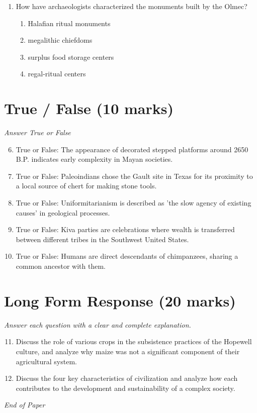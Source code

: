 \documentclass[12pt]{article}
\begin{document}
\begin{enumerate}[label=\arabic*.]
\begin{enumerate}[label=(\alph*)]
    \item greater regional differentiation
    \item active trading between the North and South
\end{enumerate}
\item How have archaeologists characterized the monuments built by the Olmec?
\begin{enumerate}[label=(\alph*)]
    \item Halafian ritual monuments
    \item megalithic chiefdoms
    \item surplus food storage centers
    \item regal-ritual centers
\end{enumerate}
\end{enumerate}

\section*{True / False (10 marks)}
\textit{Answer True or False}
\begin{enumerate}[label=\arabic*.]
\setcounter{enumi}{5}
\item True or False: The appearance of decorated stepped platforms around 2650 B.P. indicates early complexity in Mayan societies.
\item True or False: Paleoindians chose the Gault site in Texas for its proximity to a local source of chert for making stone tools.
\item True or False: Uniformitarianism is described as 'the slow agency of existing causes' in geological processes.
\item True or False: Kiva parties are celebrations where wealth is transferred between different tribes in the Southwest United States.
\item True or False: Humans are direct descendants of chimpanzees, sharing a common ancestor with them.
\end{enumerate}

\section*{Long Form Response (20 marks)}
\textit{Answer each question with a clear and complete explanation.}
\begin{enumerate}[label=\arabic*.]
\setcounter{enumi}{10}
\item Discuss the role of various crops in the subsistence practices of the Hopewell culture, and analyze why maize was not a significant component of their agricultural system.
\item Discuss the four key characteristics of civilization and analyze how each contributes to the development and sustainability of a complex society.
\end{enumerate}

\vfill
\noindent\textit{End of Paper}
\end{document}
